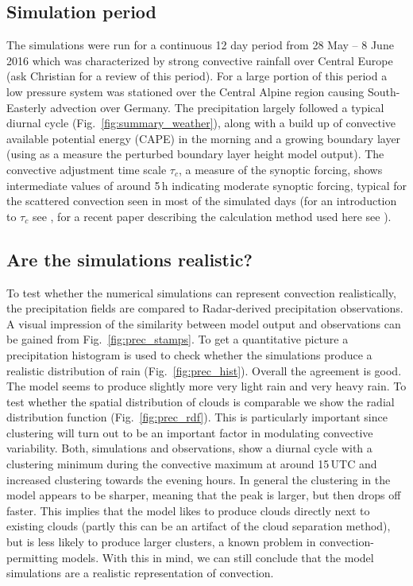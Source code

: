 \documentclass[a4paper, 12pt]{article}
\begin{document}
\subsection{Simulation period}
The simulations were run for a continuous 12 day period from 28 May -- 8 June 2016 which was characterized by strong convective rainfall over Central Europe (ask Christian for a review of this period). For a large portion of this period a low pressure system was stationed over the Central Alpine region causing South-Easterly advection over Germany. The precipitation largely followed a typical diurnal cycle (Fig.~\ref{fig:summary_weather}), along with a build up of convective available potential energy (CAPE) in the morning and a growing boundary layer (using as a measure the perturbed boundary layer height model output). The convective adjustment time scale $\tau_c$, a measure of the synoptic forcing, shows intermediate values of around 5\,h indicating moderate synoptic forcing, typical for the scattered convection seen in most of the simulated days (for an introduction to $\tau_c$ see \cite{Done2006}, for a recent paper describing the calculation method used here see \cite{Flack2016}).

\subsection{Are the simulations realistic?} 
To test whether the numerical simulations can represent convection realistically, the precipitation fields are compared to Radar-derived precipitation observations. A visual impression of the similarity between model output and observations can be gained from Fig.~\ref{fig:prec_stamps}. To get a quantitative picture a precipitation histogram is used to check whether the simulations produce a realistic distribution of rain (Fig.~\ref{fig:prec_hist}). Overall the agreement is good. The model seems to produce slightly more very light rain and very heavy rain. To test whether the spatial distribution of clouds is comparable we show the radial distribution function (Fig.~\ref{fig:prec_rdf}). This is particularly important since clustering will turn out to be an important factor in modulating convective variability. Both, simulations and observations, show a diurnal cycle with a clustering minimum during the convective maximum at around 15\,UTC and increased clustering towards the evening hours. In general the clustering in the model appears to be sharper, meaning that the peak is larger, but then drops off faster. This implies that the model likes to produce clouds directly next to existing clouds (partly this can be an artifact of the cloud separation method), but is less likely to produce larger clusters, a known problem in convection-permitting models. With this in mind, we can still conclude that the model simulations are a realistic representation of convection. 
\end{document}
